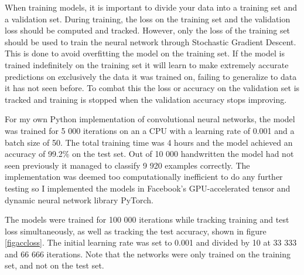 \documentclass[a4paper, twoside]{article}
\begin{document}
When training models, it is important to divide your data into a training set and a validation set. During training, the loss on the training set and the validation loss should be computed and tracked. However, only the loss of the training set should be used to train the neural network through Stochastic Gradient Descent. This is done to avoid overfitting the model on the training set. If the model is trained indefinitely on the training set it will learn to make extremely accurate predictions on exclusively the data it was trained on, failing to generalize to data it has not seen before. To combat this the loss or accuracy on the validation set is tracked and training is stopped when the validation accuracy stops improving.

For my own Python implementation of convolutional neural networks, the model was trained for 5 000 iterations on an a CPU with a learning rate of 0.001 and a batch size of 50. The total training time was 4 hours and the model achieved an accuracy of 99.2\% on the test set. Out of 10 000 handwritten the model had not seen previously it managed to classify 9 920 examples correctly. The implementation was deemed too computationally inefficient to do any further testing so I implemented the models in Facebook's GPU-accelerated tensor and dynamic neural network library PyTorch.

The models were trained for 100 000 iterations while tracking training and test loss simultaneously, as well as tracking the test accuracy, shown in figure \ref{figaccloss}. The initial learning rate was set to 0.001 and divided by 10 at 33 333 and 66 666 iterations. Note that the networks were only trained on the training set, and not on the test set.
\end{document}
